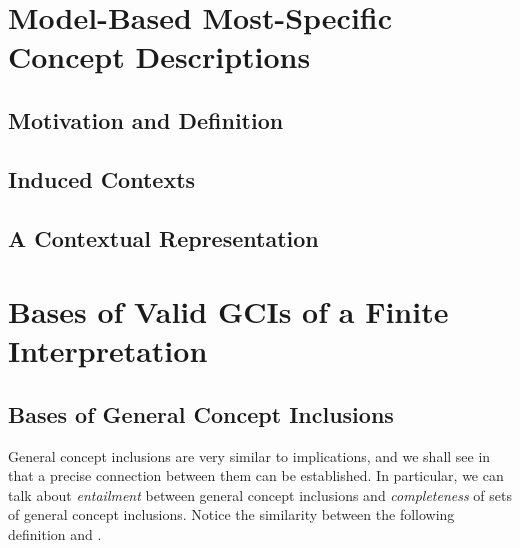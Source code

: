 \section{Model-Based Most-Specific Concept Descriptions}
\label{sec:motivation}

\subsection{Motivation and Definition}
\label{sec:motiv-defin}

%
%
%
%

\subsection{Induced Contexts}
\label{sec:induced-contexts}

%

\subsection{A Contextual Representation}
\label{sec:cont-repr-all}

%

\section{Bases of Valid GCIs of a Finite Interpretation}
\label{sec:base-all-valid}

\subsection{Bases of General Concept Inclusions}
\label{sec:bases-gener-conc}

General concept inclusions are very similar to implications, and we shall see in
 that a precise connection between them can be established.  In
particular, we can talk about \emph{entailment} between general concept inclusions and
\emph{completeness} of sets of general concept inclusions.  Notice the similarity between
the following definition and .

